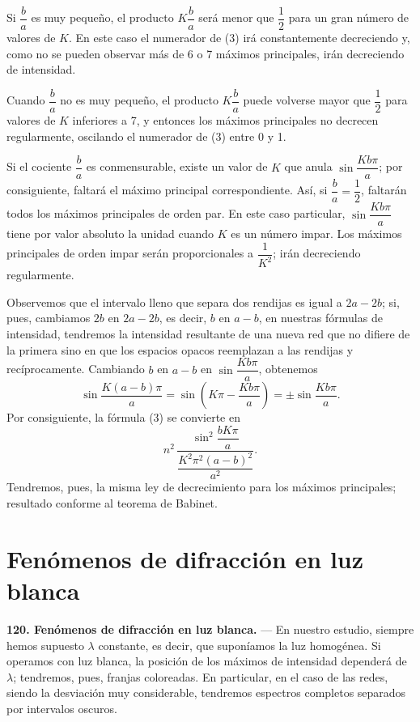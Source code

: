 Si $\dfrac{b}{a}$ es muy pequeño, el producto $K\dfrac{b}{a}$ será menor
que $\dfrac12$ para un gran número de valores de $K$. En este caso el
numerador de (3) irá constantemente decreciendo y, como no se pueden
observar más de 6 o 7 máximos principales, irán decreciendo de
intensidad.

Cuando $\dfrac{b}{a}$ no es muy pequeño, el producto $K\dfrac{b}{a}$
puede volverse mayor que $\dfrac12$ para valores de $K$ inferiores a 7, y
entonces los máximos principales no decrecen regularmente, oscilando el
numerador de (3) entre 0 y 1.

Si el cociente $\dfrac{b}{a}$ es conmensurable, existe un valor de $K$
que anula $\sin\dfrac{Kb\pi}{a}$; por consiguiente, faltará el máximo
principal correspondiente. Así, si $\dfrac{b}{a}=\dfrac12$, faltarán
todos los máximos principales de orden par. En este caso particular,
$\sin\dfrac{Kb\pi}{a}$ tiene por valor absoluto la unidad cuando $K$ es un
número impar. Los máximos principales de orden impar serán
proporcionales a $\dfrac{1}{K^2}$; irán decreciendo regularmente.

Observemos que el intervalo lleno que separa dos rendijas es igual a
$2a-2b$; si, pues, cambiamos $2b$ en $2a-2b$, es decir, $b$ en $a-b$, en
nuestras fórmulas de intensidad, tendremos la intensidad resultante de
una nueva red que no difiere de la primera sino en que los espacios
opacos reemplazan a las rendijas y recíprocamente. Cambiando $b$ en
$a-b$ en $\sin\dfrac{Kb\pi}{a}$, obtenemos
\[
\sin\frac{K(a-b)\pi}{a} = \sin\left(K\pi-\frac{Kb\pi}{a}\right)
= \pm\sin\frac{Kb\pi}{a}.
\]
Por consiguiente, la fórmula (3) se convierte en
\[
n^2\,\dfrac{\sin^2\dfrac{bK\pi}{a}}{\dfrac{K^2\pi^2(a-b)^2}{a^2}}.
\]
Tendremos, pues, la misma ley de decrecimiento para los máximos
principales; resultado conforme al teorema de Babinet.

\section{Fenómenos de difracción en luz blanca}

\noindent\textbf{120. Fenómenos de difracción en luz blanca.} — En
nuestro estudio, siempre hemos supuesto $\lambda$ constante, es decir,
que suponíamos la luz homogénea. Si operamos con luz blanca, la posición
de los máximos de intensidad dependerá de $\lambda$; tendremos, pues,
franjas coloreadas. En particular, en el caso de las redes, siendo la
desviación muy considerable, tendremos espectros completos separados por
intervalos oscuros.
